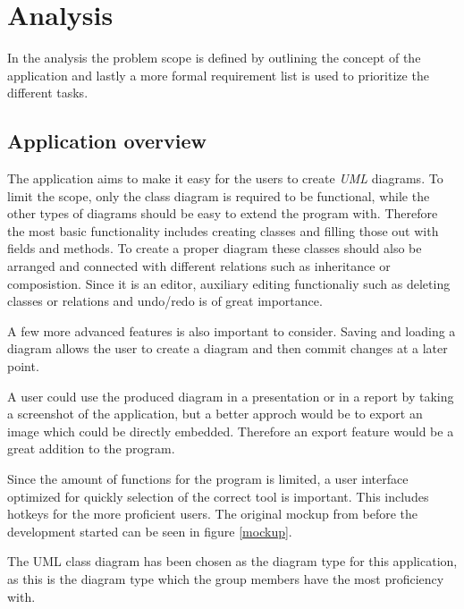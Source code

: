 \section{Analysis}
In the analysis the problem scope is defined by outlining the concept of the
application and lastly a more formal requirement list is used to prioritize the
different tasks.

\subsection{Application overview}
The application aims to make it easy for the users to create \textit{UML}
diagrams. To limit the scope, only the class diagram is required to be
functional, while the other types of diagrams should be easy to extend 
the program with. Therefore the most basic functionality includes creating
classes and filling those out with fields and methods. To create a proper
diagram these classes should also be arranged and connected with different
relations such as inheritance or composistion. Since it is an editor, auxiliary
editing functionaliy such as deleting classes or relations and undo/redo is
of great importance. 

A few more advanced features is also important to consider. Saving and loading a
diagram allows the user to create a diagram and then commit changes at a later
point.

A user could use the produced diagram in a presentation or in a report by
taking a screenshot of the application, but a better approch would be to export
an image which could be directly embedded. Therefore an export feature would be
a great addition to the program. 

Since the amount of functions for the program is limited, a user interface
optimized for quickly selection of the correct tool is important. This
includes hotkeys for the more proficient users. The original mockup from before
the development started can be seen in figure \ref{mockup}.

The UML class diagram has been chosen as the diagram type for this application, 
as this is the diagram type which the group members have the most proficiency with.

